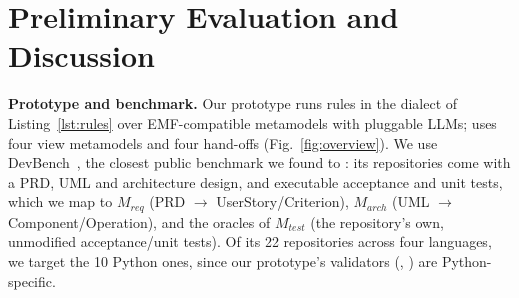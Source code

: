 %

\section{Preliminary Evaluation and Discussion}\label{sec:eval}

\noindent\textbf{Prototype and benchmark.} Our prototype runs rules in
the dialect of Listing~\ref{lst:rules} over EMF-compatible metamodels with
pluggable LLMs; \devteam{} uses four view metamodels and four hand-offs
(Fig.~\ref{fig:overview}). We use DevBench~\cite{li2024devbench}, the
closest public benchmark we found to \devteam{}: its repositories come with
a PRD, UML and architecture design, and executable acceptance and unit
tests, which we map to $M_{\mathit{req}}$ (PRD $\to$ UserStory/Criterion),
$M_{\mathit{arch}}$ (UML $\to$ Component/Operation), and the oracles of
$M_{\mathit{test}}$ (the repository's own, unmodified acceptance/unit
tests). Of its 22 repositories across four languages, we target the 10
Python ones, since our prototype's validators (,
) are Python-specific.

